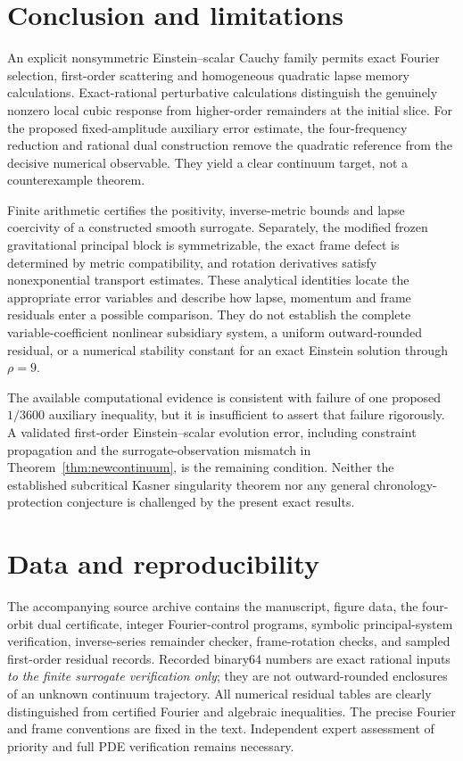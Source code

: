 \documentclass[11pt,a4paper]{article}
\theoremstyle{remark}
\begin{document}
\section{Conclusion and limitations}
An explicit nonsymmetric Einstein--scalar Cauchy family permits exact Fourier selection, first-order scattering and homogeneous quadratic lapse memory calculations. Exact-rational perturbative calculations distinguish the genuinely nonzero local cubic response from higher-order remainders at the initial slice. For the proposed fixed-amplitude auxiliary error estimate, the four-frequency reduction and rational dual construction remove the quadratic reference from the decisive numerical observable. They yield a clear continuum target, not a counterexample theorem.

Finite arithmetic certifies the positivity, inverse-metric bounds and lapse coercivity of a constructed smooth surrogate. Separately, the modified frozen gravitational principal block is symmetrizable, the exact frame defect is determined by metric compatibility, and rotation derivatives satisfy nonexponential transport estimates. These analytical identities locate the appropriate error variables and describe how lapse, momentum and frame residuals enter a possible comparison. They do not establish the complete variable-coefficient nonlinear subsidiary system, a uniform outward-rounded residual, or a numerical stability constant for an exact Einstein solution through $\rho=9$.

The available computational evidence is consistent with failure of one proposed $1/3600$ auxiliary inequality, but it is insufficient to assert that failure rigorously. A validated first-order Einstein--scalar evolution error, including constraint propagation and the surrogate-observation mismatch in Theorem~\ref{thm:newcontinuum}, is the remaining condition. Neither the established subcritical Kasner singularity theorem \cite{FRS} nor any general chronology-protection conjecture is challenged by the present exact results.

\section*{Data and reproducibility}
The accompanying source archive contains the manuscript, figure data, the four-orbit dual certificate, integer Fourier-control programs, symbolic principal-system verification, inverse-series remainder checker, frame-rotation checks, and sampled first-order residual records. Recorded binary64 numbers are exact rational inputs \emph{to the finite surrogate verification only}; they are not outward-rounded enclosures of an unknown continuum trajectory. All numerical residual tables are clearly distinguished from certified Fourier and algebraic inequalities. The precise Fourier and frame conventions are fixed in the text. Independent expert assessment of priority and full PDE verification remains necessary.
\end{document}
